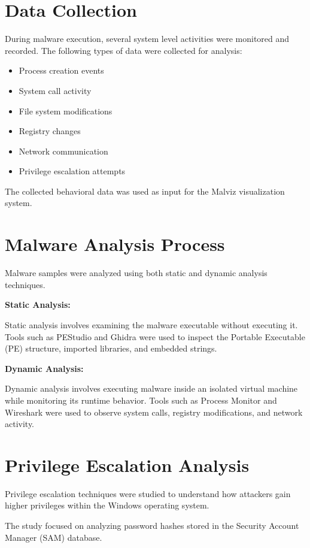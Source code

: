 \section{Data Collection}

During malware execution, several system level activities were monitored and recorded. 
The following types of data were collected for analysis:

\begin{itemize}
\item Process creation events
\item System call activity
\item File system modifications
\item Registry changes
\item Network communication
\item Privilege escalation attempts
\end{itemize}

The collected behavioral data was used as input for the Malviz visualization system.

\section{Malware Analysis Process}

Malware samples were analyzed using both static and dynamic analysis techniques.

\textbf{Static Analysis:}

Static analysis involves examining the malware executable without executing it. 
Tools such as PEStudio and Ghidra were used to inspect the Portable Executable (PE) 
structure, imported libraries, and embedded strings.

\textbf{Dynamic Analysis:}

Dynamic analysis involves executing malware inside an isolated virtual machine while 
monitoring its runtime behavior. Tools such as Process Monitor and Wireshark were used 
to observe system calls, registry modifications, and network activity.

\section{Privilege Escalation Analysis}

Privilege escalation techniques were studied to understand how attackers gain higher 
privileges within the Windows operating system.

The study focused on analyzing password hashes stored in the Security Account Manager (SAM) database.

